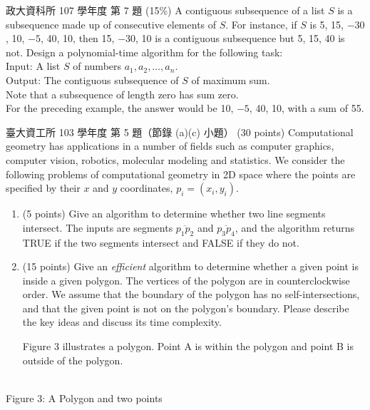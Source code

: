\begin{pastexam}[label={px:dc-4}]{政大資科所 107 學年度 第 7 題}
(15\%) A contiguous subsequence of a list $S$ is a subsequence made up of consecutive
elements of $S$. For instance, if $S$ is 5, 15, $-30$, 10, $-5$, 40, 10, then 15, $-30$, 10
is a contiguous subsequence but 5, 15, 40 is not. Design a polynomial-time algorithm for the
following task:\\
Input: A list $S$ of numbers $a_1,a_2,\ldots,a_n$.\\
Output: The contiguous subsequence of $S$ of maximum sum.\\
Note that a subsequence of length zero has sum zero.\\
For the preceding example, the answer would be 10, $-5$, 40, 10, with a sum of 55.
\end{pastexam}

\begin{pastexam}[label={px:dc-5}]{臺大資工所 103 學年度 第 5 題（節錄 (a)(c) 小題）}
(30 points) Computational geometry has applications in a number of fields such as computer
graphics, computer vision, robotics, molecular modeling and statistics. We consider the
following problems of computational geometry in 2D space where the points are specified by
their $x$ and $y$ coordinates, $p_i=(x_i,y_i)$.
\begin{enumerate}[label=(\alph*)]
\item (5 points) Give an algorithm to determine whether two line segments intersect. The
inputs are segments $\overline{p_1p_2}$ and $\overline{p_3p_4}$, and the algorithm returns
TRUE if the two segments intersect and FALSE if they do not.
\item[(c)] (15 points) Give an \textit{efficient} algorithm to determine whether a given
point is inside a given polygon. The vertices of the polygon are in counterclockwise order.
We assume that the boundary of the polygon has no self-intersections, and that the given
point is not on the polygon's boundary. Please describe the key ideas and discuss its time
complexity.

Figure 3 illustrates a polygon. Point A is within the polygon and point B is outside of the
polygon.
\end{enumerate}

\begin{center}
\\ Figure 3: A Polygon and two points\end{center}
\end{pastexam}

